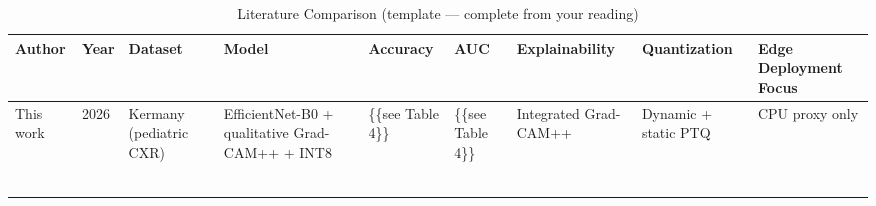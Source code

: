 \begin{table}
\caption{Literature Comparison (template — complete from your reading)}
\label{tab:lit}
\begin{tabular}{lllllllll}
\toprule
Author & Year & Dataset & Model & Accuracy & AUC & Explainability & Quantization & Edge Deployment Focus \\
\midrule
This work & 2026 & Kermany (pediatric CXR) & EfficientNet-B0 + qualitative Grad-CAM++ + INT8 & \{\{see Table 4\}\} & \{\{see Table 4\}\} & Integrated Grad-CAM++ & Dynamic + static PTQ & CPU proxy only \\
 &  &  &  &  &  &  &  &  \\
 &  &  &  &  &  &  &  &  \\
 &  &  &  &  &  &  &  &  \\
 &  &  &  &  &  &  &  &  \\
 &  &  &  &  &  &  &  &  \\
 &  &  &  &  &  &  &  &  \\
\bottomrule
\end{tabular}
\end{table}
